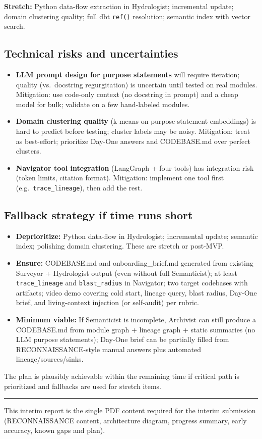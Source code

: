\documentclass[11pt,a4paper]{article}
\begin{document}
\textbf{Stretch:} Python data-flow extraction in Hydrologist; incremental update; domain clustering quality; full dbt \texttt{ref()} resolution; semantic index with vector search.

\subsection{Technical risks and uncertainties}

\begin{itemize}
  \item \textbf{LLM prompt design for purpose statements} will require iteration; quality (vs.\ docstring regurgitation) is uncertain until tested on real modules. Mitigation: use code-only context (no docstring in prompt) and a cheap model for bulk; validate on a few hand-labeled modules.
  \item \textbf{Domain clustering quality} (k-means on purpose-statement embeddings) is hard to predict before testing; cluster labels may be noisy. Mitigation: treat as best-effort; prioritize Day-One answers and CODEBASE.md over perfect clusters.
  \item \textbf{Navigator tool integration} (LangGraph + four tools) has integration risk (token limits, citation format). Mitigation: implement one tool first (e.g.\ \texttt{trace\_lineage}), then add the rest.
\end{itemize}

\subsection{Fallback strategy if time runs short}

\begin{itemize}
  \item \textbf{Deprioritize:} Python data-flow in Hydrologist; incremental update; semantic index; polishing domain clustering. These are stretch or post-MVP.
  \item \textbf{Ensure:} CODEBASE.md and onboarding\_brief.md generated from existing Surveyor + Hydrologist output (even without full Semanticist); at least \texttt{trace\_lineage} and \texttt{blast\_radius} in Navigator; two target codebases with artifacts; video demo covering cold start, lineage query, blast radius, Day-One brief, and living-context injection (or self-audit) per rubric.
  \item \textbf{Minimum viable:} If Semanticist is incomplete, Archivist can still produce a CODEBASE.md from module graph + lineage graph + static summaries (no LLM purpose statements); Day-One brief can be partially filled from RECONNAISSANCE-style manual answers plus automated lineage/sources/sinks.
\end{itemize}

The plan is plausibly achievable within the remaining time if critical path is prioritized and fallbacks are used for stretch items.

\vspace{1em}
\hrule
\vspace{0.5em}
\footnotesize
This interim report is the single PDF content required for the interim submission (RECONNAISSANCE content, architecture diagram, progress summary, early accuracy, known gaps and plan).
\end{document}
